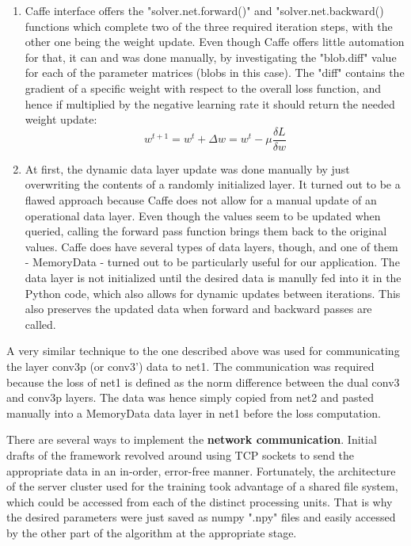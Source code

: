 \documentclass[a4paper, 12pt]{article}
\numberwithin{equation}{section}
\begin{document}
	\begin{enumerate}
		\item Caffe interface offers the "solver.net.forward()" and "solver.net.backward() functions which complete two of the three required iteration steps, with the other one being the weight update. Even though Caffe offers little automation for that, it can and was done manually, by investigating the "blob.diff" value for each of the parameter matrices (blobs in this case). The "diff" contains the gradient of a specific weight with respect to the overall loss function, and hence if multiplied by the negative learning rate it should return the needed weight update:
		\begin{equation}
		w^{t+1} = w^t + \Delta w = w^t - \mu \frac{\delta L}{\delta w}
		\end{equation}
		\item At first, the dynamic data layer update was done manually by just overwriting the contents of a randomly initialized layer.  It turned out to be a flawed approach because Caffe does not allow for a manual update of an operational data layer. Even though the values seem to be updated when queried, calling the forward pass function brings them back to the original values. Caffe does have several types of data layers, though, and one of them - MemoryData - turned out to be particularly useful for our application. The data layer is not initialized until the desired data is manully fed into it in the Python code, which also allows for dynamic updates between iterations. This also preserves the updated data when forward and backward passes are called.
	\end{enumerate}
	
	A very similar technique to the one described above was used for communicating the layer conv3p (or conv3') data to net1. The communication was required because the loss of net1 is defined as the norm difference between the dual conv3 and conv3p layers. The data was hence simply copied from net2 and pasted manually into a MemoryData data layer in net1 before the loss computation.
	
	There are several ways to implement the \textbf{network communication}. Initial drafts of the framework revolved around using TCP sockets to send the appropriate data in an in-order, error-free manner. Fortunately, the architecture of the server cluster used for the training took advantage of a shared file system, which could be accessed from each of the distinct processing units. That is why the desired parameters were just saved as numpy ".npy" files and easily accessed by the other part of the algorithm at the appropriate stage.
	
\end{document}
